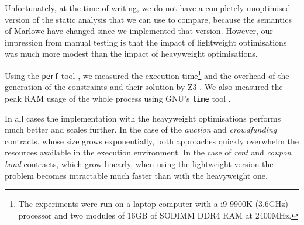 \documentclass[english,runningheads]{llncs}
\begin{document}
Unfortunately, at the time of writing, we do not have a completely unoptimised
version of the static analysis that we can use to compare, because the semantics
of Marlowe have changed since we implemented that version. However, our impression
from manual testing is that the impact of lightweight optimisations was much more modest than the impact of heavyweight optimisations.

Using the \texttt{perf} tool \cite{perf}, we measured the execution
time\footnote{The experiments were run on a laptop computer with a
i9-9900K (3.6GHz) processor and two modules of 16GB of SODIMM DDR4 RAM at 2400MHz.}
and the overhead of the generation of the constraints and their solution
by Z3 \cite{de2008z3}. We also measured the peak RAM usage of the whole
process using GNU's \texttt{time} tool \cite{keppel1998gnu}.

In all cases the implementation with the heavyweight optimisations
performs much better and scales further. In the case of the \textit{auction}
and \textit{crowdfunding} contracts, whose size grows exponentially, both
approaches quickly overwhelm the resources available in the execution environment.
In the case of \textit{rent} and \textit{coupon bond} contracts,
which grow linearly, when using the lightweight version the problem becomes 
intractable much faster than with the heavyweight one.
\end{document}
